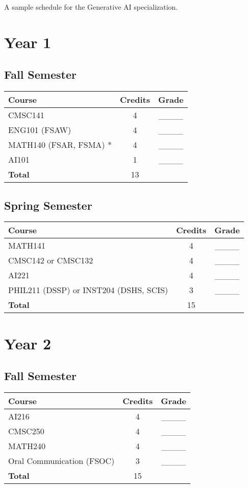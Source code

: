 
A sample schedule for the Generative AI specialization.

\section*{Year 1}
\subsection*{Fall Semester}
\begin{tabular}{|l|c|c|}
    \hline
    Course & Credits & Grade \\
    \hline
    CMSC141 & 4 & \_\_\_\_ \\
    ENG101 (FSAW) & 4 & \_\_\_\_ \\
    MATH140 (FSAR, FSMA) * & 4 & \_\_\_\_ \\
    AI101 & 1 & \_\_\_\_ \\
    \hline
    \textbf{Total} & 13 & \\
    \hline
\end{tabular}

\subsection*{Spring Semester}
\begin{tabular}{|l|c|c|}
    \hline
    Course & Credits & Grade \\
    \hline
    MATH141 & 4 & \_\_\_\_ \\
    CMSC142 or CMSC132 & 4 & \_\_\_\_ \\
    AI221 & 4 & \_\_\_\_ \\
    PHIL211 (DSSP) or INST204 (DSHS, SCIS) & 3 & \_\_\_\_ \\
    \hline
    \textbf{Total} & 15 & \\
    \hline
\end{tabular}

\section*{Year 2}
\subsection*{Fall Semester}
\begin{tabular}{|l|c|c|}
    \hline
    Course & Credits & Grade \\
    \hline
    AI216 & 4 & \_\_\_\_ \\
    CMSC250 & 4 & \_\_\_\_ \\
    MATH240 & 4 & \_\_\_\_ \\
    Oral Communication (FSOC) & 3 & \_\_\_\_ \\
    \hline
    \textbf{Total} & 15 & \\
    \hline
\end{tabular}

